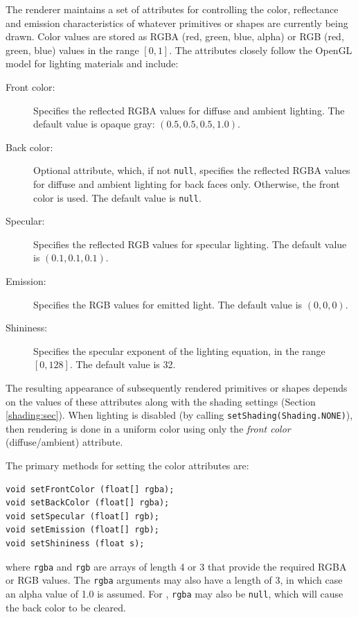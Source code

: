 The renderer maintains a set of attributes for controlling the color,
reflectance and emission characteristics of whatever primitives or
shapes are currently being drawn. Color values are stored as RGBA
(red, green, blue, alpha) or RGB (red, green, blue) values in the
range $[0,1]$. The attributes closely follow the OpenGL model for
lighting materials and include:

\begin{description}

\item[Front color:]\mbox{} 

Specifies the reflected RGBA values for diffuse
and ambient lighting.  The default value is opaque gray: $(0.5, 0.5,
0.5, 1.0)$.

\item[Back color:]\mbox{} 

Optional attribute, which, if not {\tt null},
specifies the reflected RGBA values for diffuse and ambient lighting
for back faces only. Otherwise, the front color is used. The
default value is {\tt null}.

\item[Specular:]\mbox{} 

Specifies the reflected RGB values for specular lighting.
The default value is $(0.1, 0.1, 0.1)$.

\item[Emission:]\mbox{}

Specifies the RGB values for emitted light.  The
default value is $(0, 0, 0)$.

\item[Shininess:]\mbox{}

Specifies the specular exponent of the lighting
equation, in the range $[0, 128]$. The default value is 32.

\end{description}

The resulting appearance of subsequently rendered primitives or shapes
depends on the values of these attributes along with the shading
settings (Section \ref{shading:sec}). When lighting is disabled (by
calling {\tt setShading(Shading.NONE)}), then rendering is done in a
uniform color using only the {\it front color} (diffuse/ambient)
attribute.

The primary methods for setting the color attributes are:
%
\begin{lstlisting}[]
void setFrontColor (float[] rgba);
void setBackColor (float[] rgba);
void setSpecular (float[] rgb);
void setEmission (float[] rgb);
void setShininess (float s);
\end{lstlisting}
%
where {\tt rgba} and {\tt rgb} are arrays of length 4 or 3 that
provide the required RGBA or RGB values. The {\tt rgba} arguments may
also have a length of 3, in which case an alpha value of 1.0 is
assumed. For ,
{\tt rgba} may also be {\tt null}, which will cause the back color to
be cleared.

